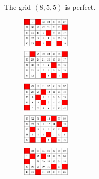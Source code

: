 \begin{con}
The grid $(8,5,5)$ is perfect.
\end{con}

\begin{figure}[]
\centering
\includegraphics[width=0.2\textwidth]{figures/4/5x8x5_numbered_heatmap.pdf}
\caption{}
\label{fig:5x8x5_numbered_heatmap.pdf}
\end{figure}




